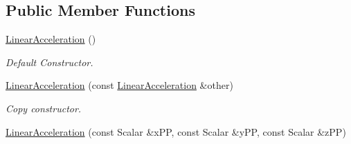 \subsection*{Public Member Functions}
\begin{DoxyCompactItemize}
\item 
\hyperlink{classow__core_1_1LinearAcceleration_a6761e3ab1a7bd77c15cb0759dd25b1e1}{Linear\+Acceleration} ()\hypertarget{classow__core_1_1LinearAcceleration_a6761e3ab1a7bd77c15cb0759dd25b1e1}{}\label{classow__core_1_1LinearAcceleration_a6761e3ab1a7bd77c15cb0759dd25b1e1}

\begin{DoxyCompactList}\small\item\em Default Constructor. \end{DoxyCompactList}\item 
\hyperlink{classow__core_1_1LinearAcceleration_a9d5c51cddac0b66f238f9be3cdc21941}{Linear\+Acceleration} (const \hyperlink{classow__core_1_1LinearAcceleration}{Linear\+Acceleration} \&other)\hypertarget{classow__core_1_1LinearAcceleration_a9d5c51cddac0b66f238f9be3cdc21941}{}\label{classow__core_1_1LinearAcceleration_a9d5c51cddac0b66f238f9be3cdc21941}

\begin{DoxyCompactList}\small\item\em Copy constructor. \end{DoxyCompactList}\item 
\hyperlink{classow__core_1_1LinearAcceleration_ad9362a092f3a21f3b0a855df367f6d1a}{Linear\+Acceleration} (const Scalar \&x\+PP, const Scalar \&y\+PP, const Scalar \&z\+PP)\hypertarget{classow__core_1_1LinearAcceleration_ad9362a092f3a21f3b0a855df367f6d1a}{}\label{classow__core_1_1LinearAcceleration_ad9362a092f3a21f3b0a855df367f6d1a}


\end{DoxyCompactItemize}
